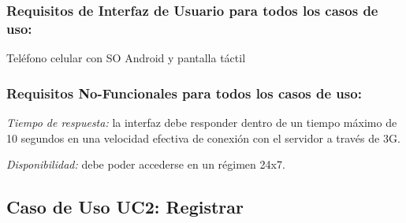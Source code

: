 \begin{framed}
\subsubsection{Requisitos de Interfaz de Usuario para todos los casos de uso: }
Teléfono celular con SO Android y pantalla táctil 

\subsubsection{Requisitos No-Funcionales para todos los casos de uso:}
\emph{Tiempo de respuesta:} la interfaz debe responder dentro de un tiempo máximo de 10 segundos en una velocidad efectiva de conexión con el servidor a través de 3G.

\emph{Disponibilidad:} debe poder accederse en un régimen 24x7.
\end{framed}




\subsection{Caso de Uso UC2: Registrar}

